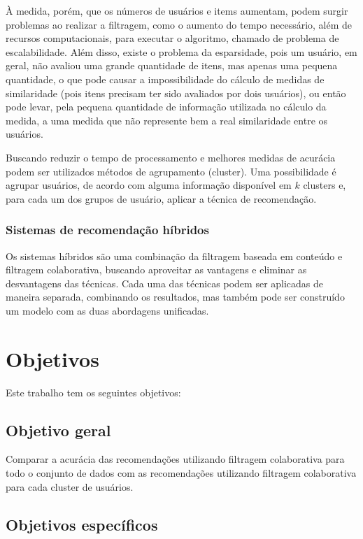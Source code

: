 \documentclass[12pt,a4paper,header]{abnt}
\begin{document}
À medida, porém, que os números de usuários e items aumentam, podem surgir problemas ao realizar a filtragem, como o aumento do tempo necessário, além de recursos computacionais, para executar o algoritmo, chamado de problema de escalabilidade\cite{dakhel2011new}. Além disso, existe o problema da esparsidade, pois um usuário, em geral, não avaliou uma grande quantidade de itens, mas apenas uma pequena quantidade, o que pode causar a impossibilidade do cálculo de medidas de similaridade (pois itens precisam ter sido avaliados por dois usuários), ou então pode levar, pela pequena quantidade de informação utilizada no cálculo da medida, a uma medida que não represente bem a real similaridade entre os usuários\cite{dakhel2011new}.

Buscando reduzir o tempo de processamento e melhores medidas de acurácia podem ser utilizados métodos de agrupamento (cluster)\cite{o1999clustering}. Uma possibilidade é agrupar usuários, de acordo com alguma informação disponível em $k$ clusters e, para cada um dos grupos de usuário, aplicar a técnica de recomendação.  

\subsection{Sistemas de recomendação híbridos}

Os sistemas híbridos são uma combinação da filtragem baseada em conteúdo e filtragem colaborativa, buscando aproveitar as vantagens e eliminar as desvantagens das técnicas\cite{shapira2011recommender}. Cada uma das técnicas podem ser aplicadas de maneira separada, combinando os resultados, mas também pode ser construído um modelo com as duas abordagens unificadas\cite{takahashi2015estudo}.

\chapter{Objetivos}

Este trabalho tem os seguintes objetivos:

\section{Objetivo geral}

Comparar a acurácia das recomendações utilizando filtragem colaborativa para todo o conjunto de dados com as recomendações utilizando filtragem colaborativa para cada cluster de usuários.

\section{Objetivos específicos}
\end{document}
